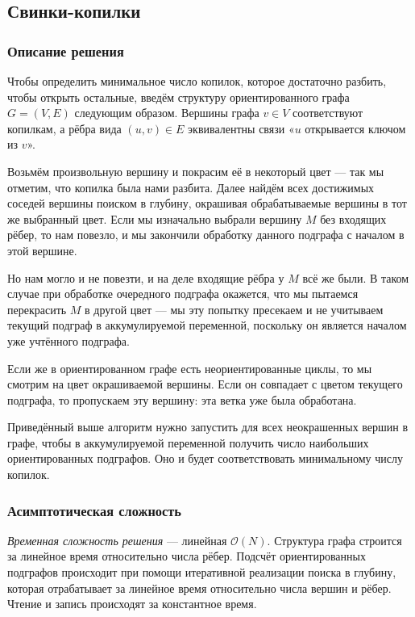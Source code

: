 \subsection{Свинки-копилки}

\subsubsection{Описание решения}

Чтобы определить минимальное число копилок, которое достаточно разбить, чтобы открыть остальные, введём структуру ориентированного графа \( G=(V,E) \) следующим образом. Вершины графа \( v\in V \) соответствуют копилкам, а рёбра вида \( (u,v)\in E \) эквивалентны связи «$u$ открывается ключом из $v$».

Возьмём произвольную вершину и покрасим её в некоторый цвет --- так мы отметим, что копилка была нами разбита. Далее найдём всех достижимых соседей вершины поиском в глубину, окрашивая обрабатываемые вершины в тот же выбранный цвет. Если мы изначально выбрали вершину \( M \) без входящих рёбер, то нам повезло, и мы закончили обработку данного подграфа с началом в этой вершине.

Но нам могло и не повезти, и на деле входящие рёбра у \( M \) всё же были. В таком случае при обработке очередного подграфа окажется, что мы пытаемся перекрасить \( M \) в другой цвет --- мы эту попытку пресекаем и не учитываем текущий подграф в аккумулируемой переменной, поскольку он является началом уже учтённого подграфа.

Если же в ориентированном графе есть неориентированные циклы, то мы смотрим на цвет окрашиваемой вершины. Если он совпадает с цветом текущего подграфа, то пропускаем эту вершину: эта ветка уже была обработана. 

Приведённый выше алгоритм нужно запустить для всех неокрашенных вершин в графе, чтобы в аккумулируемой переменной получить число наибольших ориентированных подграфов. Оно и будет соответствовать минимальному числу копилок.

\subsubsection{Асимптотическая сложность}

\textit{Временная сложность решения} --- линейная \( \mathcal{O}(N) \). Структура графа строится за линейное время относительно числа рёбер. Подсчёт ориентированных подграфов происходит при помощи итеративной реализации поиска в глубину, которая отрабатывает за линейное время относительно числа вершин и рёбер. Чтение и запись происходят за константное время.

